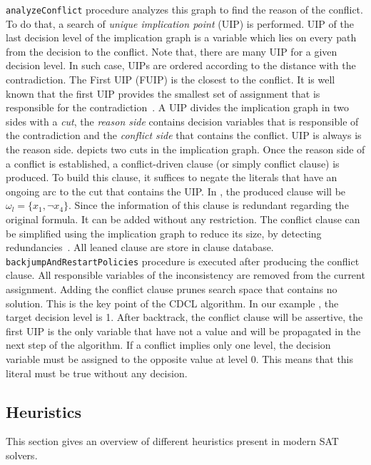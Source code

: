 \texttt{analyzeConflict} procedure analyzes this graph to find the reason of the conflict. To do that, a search of
\emph{unique implication point} (UIP) is performed. UIP of the last decision level of the implication graph is a variable
which lies on every path from the decision to the conflict. Note that, there are many UIP for a given decision level.
In such case, UIPs are ordered according to the distance with the contradiction. The First UIP (FUIP) is the closest to
the conflict. It is well known that the first UIP provides the smallest set of assignment that is responsible for the
contradiction~\cite{zhang2001efficient}.
A UIP divides the implication graph in two sides with a \emph{cut}, the \emph{reason side} contains decision variables 
that is responsible of the contradiction and the \emph{conflict side} that contains the conflict. 
 UIP is always is the 
reason side.  depicts two cuts in the implication graph.
Once the reason side of a conflict is established, a conflict-driven clause (or simply conflict clause) is produced.
To build this clause, it suffices to negate the
literals that have an ongoing arc to the  cut that contains the UIP. In , the produced
clause will be $\omega_l = \{x_1, \neg x_4 \}$. Since the information of this clause is redundant regarding 
the original formula. It can be added without any  restriction. The conflict clause can be simplified
using the implication graph to reduce its size, by detecting
redundancies~\cite{sorensson2009minimizing}. All leaned clause are store in clause database.
\texttt{backjumpAndRestartPolicies} procedure is executed after producing the conflict clause.
All responsible variables of the inconsistency are removed from the current assignment.
Adding the conflict clause prunes search space that contains no solution. This is the key point of the CDCL algorithm. In our example , the target decision level is 1.
After backtrack, the conflict clause will be assertive, the first UIP is the only variable that 
have not a value and will be propagated in the next step of the  algorithm.
If a conflict implies only one level, the decision variable must be assigned 
to the opposite value at level 0. This means that this literal must be true without any decision.
 
 
\subsection{Heuristics}\label{sec:heuristics}
This section gives an overview of different heuristics present in modern SAT solvers.

